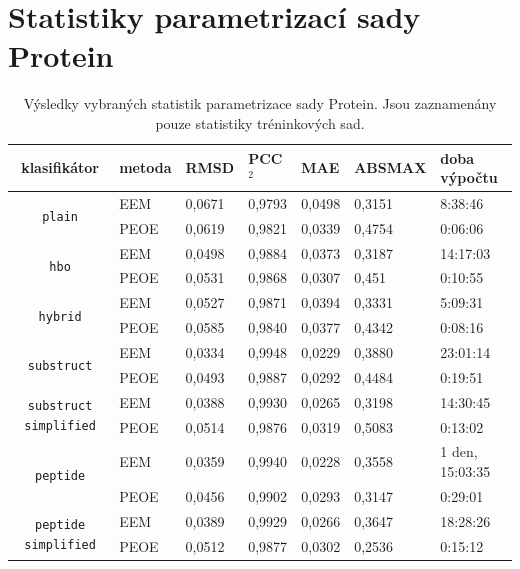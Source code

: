 \chapter{Statistiky parametrizací sady Protein}
\label{proteinstat}
\begin{table}[h]
    \renewcommand{\arraystretch}{1.4}
    \centering
    \begin{tabular}{c|l|l|l|l|l|l}
         \textbf{klasifikátor} &  \textbf{metoda} & \textbf{RMSD} & \textbf{PCC$^2$} & \textbf{MAE} & \textbf{ABSMAX} & \textbf{doba výpočtu}\\
         \hline
         \multirow{2}{6em}{\texttt{plain}} & EEM & 0,0671 & 0,9793 & 0,0498 & 0,3151 & 8:38:46  \\
         & PEOE & 0,0619 & 0,9821 & 0,0339 & 0,4754 & 0:06:06    \\
         \hline
         \multirow{2}{6em}{\texttt{hbo}} & EEM & 0,0498 & 0,9884 & 0,0373 & 0,3187 & 14:17:03 \\
         & PEOE & 0,0531 & 0,9868 & 0,0307 & 0,451 & 0:10:55 \\
         \hline
         \multirow{2}{6em}{\texttt{hybrid}} & EEM & 0,0527 & 0,9871 & 0,0394 & 0,3331 & 5:09:31 \\
         & PEOE & 0,0585 & 0,9840 & 0,0377 & 0,4342 & 0:08:16 \\
         \hline
         \multirow{2}{6em}{\texttt{substruct}} & EEM & 0,0334 & 0,9948 & 0,0229 & 0,3880 & 23:01:14 \\
         & PEOE & 0,0493 & 0,9887 & 0,0292 & 0,4484 & 0:19:51 \\
         \hline
         \multirow{2}{6em}{\texttt{substruct simplified}} & EEM & 0,0388 & 0,9930 & 0,0265 & 0,3198 & 14:30:45 \\
         & PEOE & 0,0514 & 0,9876 & 0,0319 & 0,5083 & 0:13:02 \\
         \hline
         \multirow{2}{6em}{\texttt{peptide}} & EEM & 0,0359 & 0,9940 & 0,0228 & 0,3558 & 1 den, 15:03:35 \\
         & PEOE & 0,0456 & 0,9902 & 0,0293 & 0,3147 & 0:29:01 \\
         \hline
         \multirow{2}{6em}{\texttt{peptide simplified}} & EEM & 0,0389 & 0,9929 & 0,0266 & 0,3647 & 18:28:26 \\
         & PEOE & 0,0512 & 0,9877 & 0,0302 & 0,2536 & 0:15:12
    \end{tabular}
    \caption{Výsledky vybraných statistik parametrizace sady Protein. Jsou zaznamenány pouze statistiky tréninkových sad.}
    \label{statistics_PDB}
\end{table}

